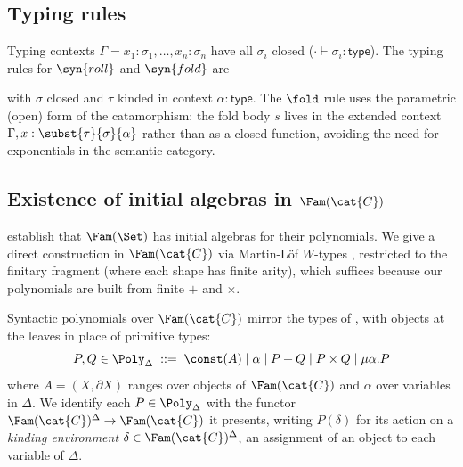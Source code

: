 \subsection{Typing rules}
\label{sec:polynomial-types:language}

Typing contexts $\Gamma = x_1 : \sigma_1, \ldots, x_n : \sigma_n$ have all $\sigma_i$ closed
($\cdot \vdash \sigma_i : \mathsf{type}$). The typing rules for $\syn{roll}$ and $\syn{fold}$ are
with $\sigma$ closed and $\tau$ kinded in context $\alpha : \mathsf{type}$. The $\fold$ rule uses the
parametric (open) form of the catamorphism: the fold body $s$ lives in the extended context $\Gamma, x :
\subst{\tau}{\sigma}{\alpha}$ rather than as a closed function, avoiding the need for exponentials in the
semantic category.

\subsection{Existence of initial algebras in $\Fam(\cat{C})$}
\label{sec:polynomial-types:fam}

\citet[Proposition~81]{nunes2023} establish that $\Fam(\Set)$ has initial algebras for their polynomials. We
give a direct construction in $\Fam(\cat{C})$ via Martin-L\"of $W$-types
\citep[Wellorderings, pp.~43--47]{martinLof1984}, restricted to the finitary fragment (where each shape has
finite arity), which suffices because our polynomials are built from finite $+$ and $\times$.

Syntactic polynomials over $\Fam(\cat{C})$ mirror the types of , with
objects at the leaves in place of primitive types:
\[
  P, Q \in \Poly_\Delta \;::=\; \const(A) \mid \alpha \mid P + Q \mid P \times Q \mid \mu\alpha.P
\]
where $A = (X, \partial X)$ ranges over objects of $\Fam(\cat{C})$ and $\alpha$ over variables in $\Delta$.
We identify each $P \in \Poly_\Delta$ with the functor $\Fam(\cat{C})^\Delta \to \Fam(\cat{C})$ it
presents, writing $P(\delta)$ for its action on a \emph{kinding environment} $\delta \in
\Fam(\cat{C})^\Delta$, an assignment of an object to each variable of $\Delta$.

